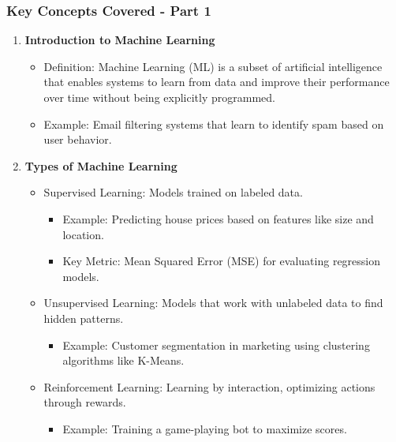 \documentclass[aspectratio=169]{beamer}
\begin{document}
\begin{frame}[fragile]
    \frametitle{Key Concepts Covered - Part 1}
    \begin{enumerate}
        \item \textbf{Introduction to Machine Learning}
            \begin{itemize}
                \item Definition: Machine Learning (ML) is a subset of artificial intelligence that enables systems to learn from data and improve their performance over time without being explicitly programmed.
                \item Example: Email filtering systems that learn to identify spam based on user behavior.
            \end{itemize}
        \item \textbf{Types of Machine Learning}
            \begin{itemize}
                \item Supervised Learning: Models trained on labeled data.
                    \begin{itemize}
                        \item Example: Predicting house prices based on features like size and location.
                        \item Key Metric: Mean Squared Error (MSE) for evaluating regression models.
                    \end{itemize}
                \item Unsupervised Learning: Models that work with unlabeled data to find hidden patterns.
                    \begin{itemize}
                        \item Example: Customer segmentation in marketing using clustering algorithms like K-Means.
                    \end{itemize}
                \item Reinforcement Learning: Learning by interaction, optimizing actions through rewards.
                    \begin{itemize}
                        \item Example: Training a game-playing bot to maximize scores.
                    \end{itemize}
            \end{itemize}
    \end{enumerate}
\end{frame}
\end{document}
